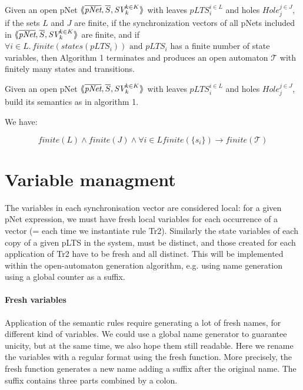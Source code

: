 \documentclass{lncs/llncs}
\begin{document}
\begin{theorem}\\
Given an open pNet $\mylangle \overline{\pNet},\overline{S}, \symb{SV}_k^{k\in K}\myrangle$ with leaves $pLTS_i^{i\in L}$ and holes $Hole_j^{j\in
  J}$, if the sets $L$ and $J$ are finite, if the synchronization vectors of all pNets 
  included in  $\mylangle \overline{\pNet},\overline{S}, \symb{SV}_k^{k\in K}\myrangle$ 
  are finite, and if
$\forall i \in L.\, finite{(states(pLTS_i))} \text{ and } pLTS_i$
has a finite number of state variables, then Algorithm 1 terminates
and produces an open automaton 
$\mathcal{T}$ with finitely many states and transitions.


Given an open pNet $\mylangle \overline{\pNet},\overline{S}, \symb{SV}_k^{k\in
    K}\myrangle$ with leaves $pLTS_i^{i\in L}$ and holes $Hole_j^{j\in
  J}$,
build its semantics as in algorithm 1.

We have:

$$ finite{(L)} \land finite{(J)} \land \forall i \in L finite{(\{s_i\})}
  \to finite{(\mathcal{T})}$$
\end{theorem}




\section{Variable managment}
\label{appendix:varaibles}
The variables in each synchronisation vector are considered local: for
a given pNet expression, we must have fresh local variables for each
occurrence of a vector (= each time we instantiate rule
Tr2). Similarly the state variables of each copy of a given pLTS in
the system, must be distinct, and those created for each application
of Tr2 have to be fresh and all distinct. This will be implemented
within the open-automaton generation algorithm, e.g. using name
generation using a global counter as a suffix.

\paragraph{Fresh variables}
Application of the semantic rules require generating a lot of fresh
names, for different kind of variables. We could use a global name
generator to guarantee unicity, but 
at the same time, we also hope them still
readable. Here we rename the variables with a regular format using the fresh function.
More precisely, the fresh function generates a new name adding a
suffix after the original name. The suffix contains three parts
combined by a colon.  
\end{document}
